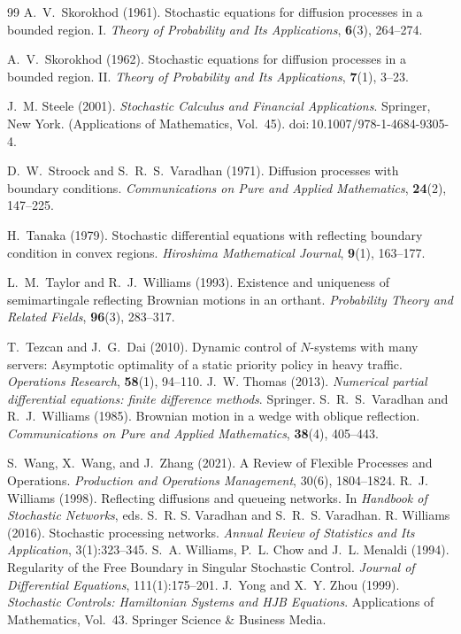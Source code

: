 \documentclass[11pt]{article}
\theoremstyle{definition}
\theoremstyle{plain}
\begin{document}
\begin{singlespace}
\begin{thebibliography}{99}
A.~V.~Skorokhod (1961).
Stochastic equations for diffusion processes in a bounded region. I.
\emph{Theory of Probability and Its Applications}, \textbf{6}(3), 264--274.

A.~V.~Skorokhod (1962).
Stochastic equations for diffusion processes in a bounded region. II.
\emph{Theory of Probability and Its Applications}, \textbf{7}(1), 3--23.

J.~M. Steele (2001).
\newblock \emph{Stochastic Calculus and Financial Applications}.
\newblock Springer, New York. \newblock (Applications of Mathematics, Vol.~45). \newblock doi:\,10.1007/978-1-4684-9305-4.

D.~W.~Stroock and S.~R.~S.~Varadhan (1971).
Diffusion processes with boundary conditions.
\emph{Communications on Pure and Applied Mathematics}, \textbf{24}(2), 147--225.

H.~Tanaka (1979).
Stochastic differential equations with reflecting boundary condition in convex regions.
\emph{Hiroshima Mathematical Journal}, \textbf{9}(1), 163--177.

L.~M.~Taylor and R.~J.~Williams (1993).
Existence and uniqueness of semimartingale reflecting Brownian motions in an orthant.
\emph{Probability Theory and Related Fields}, \textbf{96}(3), 283--317.

T.~Tezcan and J.~G.~Dai (2010).
Dynamic control of $N$-systems with many servers: Asymptotic optimality of a static priority policy in heavy traffic.
\emph{Operations Research}, \textbf{58}(1), 94--110.
   J.~W. Thomas (2013). \newblock \emph{Numerical partial differential equations: finite difference methods}. \newblock Springer. 
S.~R.~S.~Varadhan and R.~J.~Williams (1985).
Brownian motion in a wedge with oblique reflection.
\emph{Communications on Pure and Applied Mathematics}, \textbf{38}(4), 405--443.

S.~Wang, X.~Wang, and J.~Zhang (2021).
A Review of Flexible Processes and Operations.
\emph{Production and Operations Management}, 30(6), 1804--1824.
   R.~J. Williams (1998). \newblock Reflecting diffusions and queueing networks. \newblock In \emph{Handbook of Stochastic Networks}, eds. S.~R. S. Varadhan and S.~R.~S. Varadhan. %
   R. Williams (2016). \newblock Stochastic processing networks. \newblock \emph{Annual Review of Statistics and Its Application}, 3(1):323--345.
   S.~A. Williams, P.~L. Chow and J.~L. Menaldi (1994). \newblock Regularity of the Free Boundary in Singular Stochastic Control.
  \newblock \emph{Journal of Differential Equations}, 111(1):175--201.
   J.~Yong and X.~Y. Zhou (1999). \newblock \emph{Stochastic Controls: Hamiltonian Systems and HJB Equations}. \newblock Applications of Mathematics, Vol.~43. Springer Science \& Business Media.
\end{thebibliography}
\end{singlespace}
\endgroup
\end{document}
